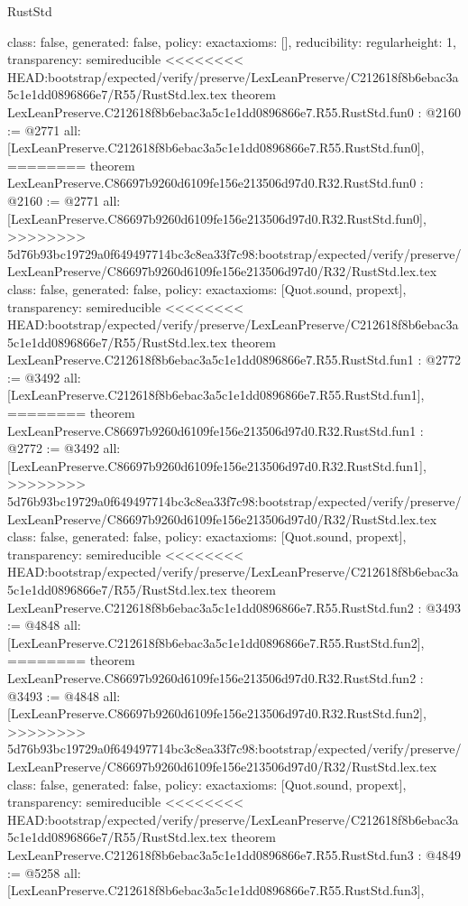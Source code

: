 \begin{lexlean}{RustStd}
\begin{coremodule}
{\begin{coremodule}
{{{  class: false,
  generated: false,
  policy: exact{axioms: []},
  reducibility: regular{height: 1},
  transparency: semireducible
}
<<<<<<<< HEAD:bootstrap/expected/verify/preserve/LexLeanPreserve/C212618f8b6ebac3a5c1e1dd0896866e7/R55/RustStd.lex.tex
theorem LexLeanPreserve.C212618f8b6ebac3a5c1e1dd0896866e7.R55.RustStd.fun0 : @2160 := @2771 {
  all: [LexLeanPreserve.C212618f8b6ebac3a5c1e1dd0896866e7.R55.RustStd.fun0],
========
theorem LexLeanPreserve.C86697b9260d6109fe156e213506d97d0.R32.RustStd.fun0 : @2160 := @2771 {
  all: [LexLeanPreserve.C86697b9260d6109fe156e213506d97d0.R32.RustStd.fun0],
>>>>>>>> 5d76b93bc19729a0f649497714bc3c8ea33f7c98:bootstrap/expected/verify/preserve/LexLeanPreserve/C86697b9260d6109fe156e213506d97d0/R32/RustStd.lex.tex
  class: false,
  generated: false,
  policy: exact{axioms: [Quot.sound, propext]},
  transparency: semireducible
}
<<<<<<<< HEAD:bootstrap/expected/verify/preserve/LexLeanPreserve/C212618f8b6ebac3a5c1e1dd0896866e7/R55/RustStd.lex.tex
theorem LexLeanPreserve.C212618f8b6ebac3a5c1e1dd0896866e7.R55.RustStd.fun1 : @2772 := @3492 {
  all: [LexLeanPreserve.C212618f8b6ebac3a5c1e1dd0896866e7.R55.RustStd.fun1],
========
theorem LexLeanPreserve.C86697b9260d6109fe156e213506d97d0.R32.RustStd.fun1 : @2772 := @3492 {
  all: [LexLeanPreserve.C86697b9260d6109fe156e213506d97d0.R32.RustStd.fun1],
>>>>>>>> 5d76b93bc19729a0f649497714bc3c8ea33f7c98:bootstrap/expected/verify/preserve/LexLeanPreserve/C86697b9260d6109fe156e213506d97d0/R32/RustStd.lex.tex
  class: false,
  generated: false,
  policy: exact{axioms: [Quot.sound, propext]},
  transparency: semireducible
}
<<<<<<<< HEAD:bootstrap/expected/verify/preserve/LexLeanPreserve/C212618f8b6ebac3a5c1e1dd0896866e7/R55/RustStd.lex.tex
theorem LexLeanPreserve.C212618f8b6ebac3a5c1e1dd0896866e7.R55.RustStd.fun2 : @3493 := @4848 {
  all: [LexLeanPreserve.C212618f8b6ebac3a5c1e1dd0896866e7.R55.RustStd.fun2],
========
theorem LexLeanPreserve.C86697b9260d6109fe156e213506d97d0.R32.RustStd.fun2 : @3493 := @4848 {
  all: [LexLeanPreserve.C86697b9260d6109fe156e213506d97d0.R32.RustStd.fun2],
>>>>>>>> 5d76b93bc19729a0f649497714bc3c8ea33f7c98:bootstrap/expected/verify/preserve/LexLeanPreserve/C86697b9260d6109fe156e213506d97d0/R32/RustStd.lex.tex
  class: false,
  generated: false,
  policy: exact{axioms: [Quot.sound, propext]},
  transparency: semireducible
}
<<<<<<<< HEAD:bootstrap/expected/verify/preserve/LexLeanPreserve/C212618f8b6ebac3a5c1e1dd0896866e7/R55/RustStd.lex.tex
theorem LexLeanPreserve.C212618f8b6ebac3a5c1e1dd0896866e7.R55.RustStd.fun3 : @4849 := @5258 {
  all: [LexLeanPreserve.C212618f8b6ebac3a5c1e1dd0896866e7.R55.RustStd.fun3],
}}}}}}
\end{coremodule}}
\end{coremodule}
\end{lexlean}
